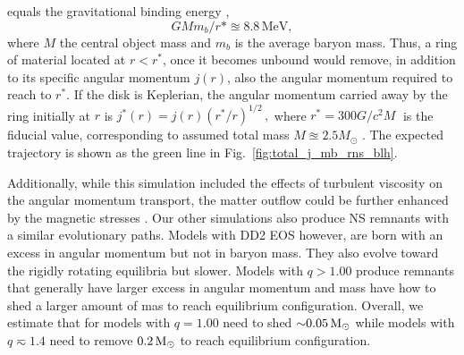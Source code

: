 equals the gravitational binding energy
\citep[\eg][]{Fernandez:2013tya}, 
%
\begin{equation*}
    G M m_b / r* \approxeq 8.8\, \text{MeV}, 
\end{equation*}
%
where $M$ the central object mass and $m_b$ is the average baryon mass.
Thus, a ring of material located at $r < r^*$, once it becomes unbound
would remove, in addition to its specific angular
momentum $j(r)$, also the angular momentum required to reach
to $r^*$. If the disk is Keplerian, the angular momentum carried away by 
the ring initially at $r$ is 
%
    $ j^*(r) = j(r) ( r^* / r )^{1/2}\, ,$
%
where $ r^{*} = 300 G / c^2 M $ is the fiducial value, corresponding
to assumed total mass $M \approxeq 2.5M_{\odot}$ \citep{Radice:2018xqa}.
The expected trajectory is shown as the green line in Fig.~\ref{fig:total_j_mb_rns_blh}.

Additionally, while this simulation included the effects of turbulent viscosity on the
angular momentum transport, the matter outflow could be further enhanced by the magnetic stresses 
\citep{Metzger:2006mw,Bucciantini:2011kx,Siegel:2017nub,Fernandez:2018kax,Ciolfi:2020hgg}.
%
%
Our other simulations also produce \ac{NS} remnants with a similar evolutionary paths. 
Models with DD2 \ac{EOS} however, are born with an excess in angular momentum but not in 
baryon mass. They also evolve toward the rigidly rotating equilibria but slower.
Models with $q>1.00$ produce remnants that generally have larger excess in angular momentum 
and mass have how to shed a larger amount of mas to reach equilibrium configuration.
Overall, we estimate that for models with $q=1.00$ need to shed ${\sim}0.05\,{\text{M}_{\odot}}$ while 
models with $q\eqsim 1.4$ need to remove $0.2\,{\text{M}_{\odot}}$ to reach equilibrium configuration.
















